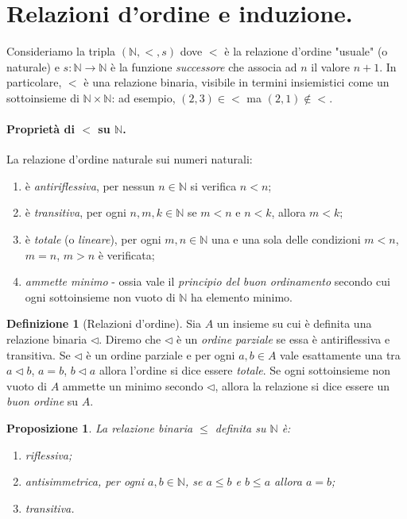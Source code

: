 \documentclass[fontsize = 11 pt, paper=A4, oneside, index=totoc, hyperref]{article}
\theoremstyle{definition}
\newtheorem{dfn}{Definizione}[section]
\theoremstyle{plain}
\newtheorem{prp}{Proposizione}[section]
\newcommand{\N}{\mathbb{N}}
\begin{document}
\tableofcontents

\section{Relazioni d'ordine e induzione.}

Consideriamo la tripla \(\left(\N, <, s \right)\) dove \(<\) è la relazione d'ordine "usuale" (o naturale) e \(s \colon \N \to \N\) è la funzione \emph{successore} che associa ad \(n\) il valore \(n+1\). In particolare, \(<\) è una relazione binaria, visibile in termini insiemistici come un sottoinsieme di \(\N \times \N\): ad esempio, \((2,3) \in <\) ma \((2,1) \notin <\).

\paragraph{Proprietà di \(<\) su \(\N\).} La relazione d'ordine naturale sui numeri naturali:
\begin{enumerate}
  \item è \emph{antiriflessiva}, per nessun \(n \in \N\) si verifica \(n < n\);
  \item è \emph{transitiva}, per ogni \(n, m, k \in \N\) se \(m < n\) e \(n < k\), allora \(m < k\);
  \item è \emph{totale} (o \emph{lineare}), per ogni \(m,n \in \N\) una e una sola delle condizioni \(m < n\), \(m = n\), \(m > n\) è verificata;
  \item \emph{ammette minimo} - ossia vale il \emph{principio del buon ordinamento} secondo cui ogni sottoinsieme non vuoto di \(\N\) ha elemento minimo.
\end{enumerate}

\begin{dfn}[Relazioni d'ordine] Sia \(A\) un insieme su cui è definita una relazione binaria \(\lhd\). Diremo che \(\lhd\) è un \emph{ordine parziale} se essa è antiriflessiva e transitiva. Se \(\lhd\) è un ordine parziale e per ogni \(a,b \in A\) vale esattamente una tra \(a \lhd b\), \(a = b\), \(b \lhd a\) allora l'ordine si dice essere \emph{totale}. Se ogni sottoinsieme non vuoto di \(A\) ammette un minimo secondo \(\lhd\), allora la relazione si dice essere un \emph{buon ordine} su \(A\).
\end{dfn}

\begin{prp} La relazione binaria \(\le\) definita su \(\N\) è:
  \begin{enumerate}
    \item \emph{riflessiva};
    \item \emph{antisimmetrica}, per ogni \(a, b \in \N\), se \(a \le b\) e \(b \le a\) allora \(a = b\);
    \item \emph{transitiva}.
  \end{enumerate}
\end{prp}
\end{document}
